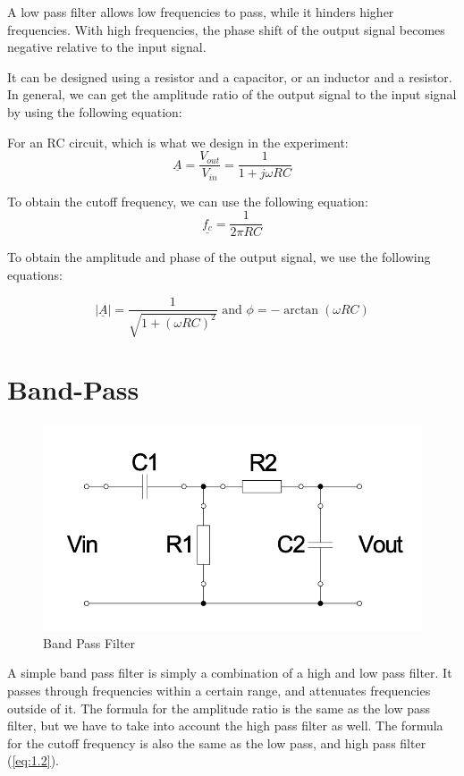 A low pass filter allows low frequencies to pass, while it hinders higher frequencies. With high frequencies, the phase shift of the output signal becomes negative relative to the input signal.


It can be designed using a resistor and a capacitor, or an inductor and a resistor.
In general, we can get the amplitude ratio of the output signal to the input signal by using the following equation:


For an RC circuit, which is what we design in the experiment:
\begin{equation}
    \underline{A} = \frac{V_{out}}{V_{in}} = \frac{1}{1 + j \omega RC}
\end{equation}


To obtain the cutoff frequency, we can use the following equation:
\begin{equation} \label{eq:1.2}
    \underline{f_c} = \frac{1}{2 \pi RC}
\end{equation}


To obtain the amplitude and phase of the output signal, we use the following equations:

\begin{equation}
    |\underline{A}| = \frac{1}{\sqrt{1 + (\omega RC)^2}} \text{ and } \phi = -\arctan(\omega RC)
\end{equation}

\section{Band-Pass}
\begin{figure}[H]
    \centering
    \includegraphics[scale=0.75]{images/figure_band_pass.png}
    \caption{Band Pass Filter}
\end{figure}


A simple band pass filter is simply a combination of a high and low pass filter. It passes through frequencies within a certain range, and attenuates frequencies outside of it.
The formula for the amplitude ratio is the same as the low pass filter, but we have to take into account the high pass filter as well. The formula for the cutoff frequency is also the same as the low pass, and high pass filter (\ref{eq:1.2}).


